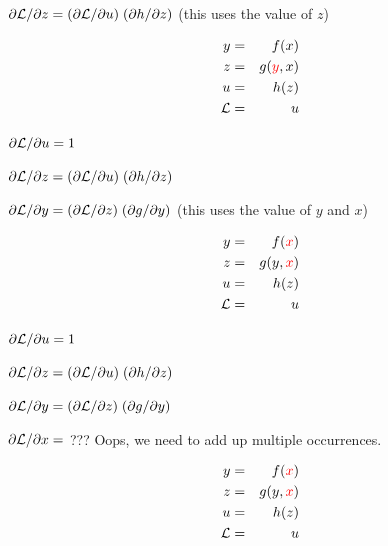 {\medskip
{\color{red} ${\partial {\cal L}}/{\partial z} = ({\partial {\cal L}}/{\partial u})\; ({\partial h}/{\partial z})$} (this uses the value of $z$)

\vspace{-3ex}
\begin{eqnarray*}
  y & = & f(x) \\
  z & = & g({\color{red} y},x) \\
  u & = & h(z) \\
  {\cal L} &  = &  u
\end{eqnarray*}

\medskip
${\partial {\cal L}}/{\partial u} = 1$

\medskip
${\partial {\cal L}}/{\partial z} = ({\partial {\cal L}}/{\partial u})\; ({\partial h}/{\partial z})$

\medskip
{\color{red} ${\partial {\cal L}}/{\partial y} = ({\partial {\cal L}}/{\partial z})\; ({\partial g}/{\partial y})$} (this uses the value of $y$ and $x$)

\vspace{-3ex}
\begin{eqnarray*}
  y & = & f({\color{red} x}) \\
  z & = & g(y,{\color{red} x}) \\
  u & = & h(z) \\
  {\cal L} &  = &  u
\end{eqnarray*}

\medskip
${\partial {\cal L}}/{\partial u} = 1$

\medskip
${\partial {\cal L}}/{\partial z} = ({\partial {\cal L}}/{\partial u})\; ({\partial h}/{\partial z})$

\medskip
${\partial {\cal L}}/{\partial y} = ({\partial {\cal L}}/{\partial z})\; ({\partial g}/{\partial y})$

\medskip
{\color{red} ${\partial {\cal L}}/{\partial x} =$ ???} Oops, we need to add up multiple occurrences.

\vspace{-3ex}
\begin{eqnarray*}
  y & = & f({\color{red} x}) \\
  z & = & g(y,{\color{red} x}) \\
  u & = & h(z) \\
  {\cal L} &  = &  u
\end{eqnarray*}

}
